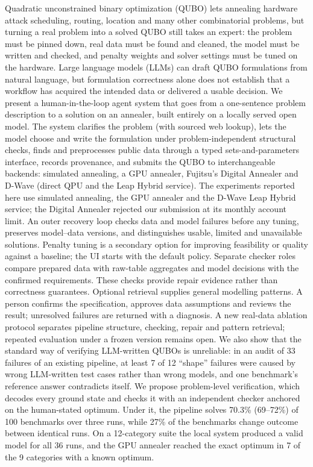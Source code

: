 Quadratic unconstrained binary optimization (QUBO) lets annealing hardware attack scheduling, routing, location
and many other combinatorial problems, but turning a real problem into a solved QUBO still takes an expert: the
problem must be pinned down, real data must be found and cleaned, the model must be written and checked, and
penalty weights and solver settings must be tuned on the hardware. Large language models
(LLMs) can draft QUBO formulations from natural language, but formulation correctness alone does not establish
that a workflow has acquired the intended data or delivered a usable decision.
We present a human-in-the-loop agent system that goes from a one-sentence problem description to a solution on
an annealer, built entirely on a locally served open model. The system clarifies the problem (with sourced web
lookup), lets the model choose and write the formulation under problem-independent structural checks, finds and
preprocesses public data through a typed sets-and-parameters interface, records provenance, and submits the QUBO to
interchangeable backends: simulated annealing, a GPU annealer, Fujitsu's Digital Annealer and D-Wave (direct QPU
and the Leap Hybrid service). The experiments reported here use simulated annealing, the GPU annealer and the
D-Wave Leap Hybrid service; the Digital Annealer rejected our submission at its monthly account limit. An outer
recovery loop checks data and model failures before any tuning, preserves model--data versions, and
distinguishes usable, limited and unavailable solutions. Penalty tuning is a secondary option for improving feasibility or quality against a baseline; the UI
starts with the default policy.
Separate checker roles compare prepared data with raw-table aggregates and model decisions with the confirmed
requirements. These checks provide repair evidence rather than correctness guarantees. Optional retrieval
supplies general modelling patterns. A person confirms the specification, approves data assumptions and reviews
the result; unresolved failures are returned with a diagnosis. A new real-data ablation protocol separates
pipeline structure, checking, repair and pattern retrieval; repeated evaluation under a frozen version remains
open.
We also show that the standard way of verifying LLM-written QUBOs is unreliable: in an audit of 33 failures of
an existing pipeline, at least 7 of 12 ``shape'' failures were caused by wrong LLM-written test cases rather than
wrong models, and one benchmark's reference answer contradicts itself. We propose problem-level verification,
which decodes every ground state and checks it with an independent checker anchored on the human-stated
optimum. Under it, the pipeline solves 70.3\% (69--72\%) of 100 benchmarks over three runs, while 27\% of the
benchmarks change outcome between identical runs. On a 12-category suite the local system produced a valid model
for all 36 runs, and the GPU annealer reached the exact optimum in 7 of the 9 categories with a known optimum.
